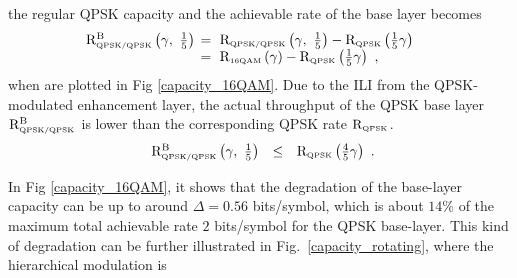 \documentclass[10pt,fleqn, twocolumn]{IEEEtran}
\begin{document}
the regular QPSK capacity and the achievable rate of the base
layer becomes
\begin{equation}\hspace{-0.2in}
\begin{array}{rl}
{\rm R}_{\mbox{\tiny QPSK/QPSK}}^{\rm B}\left(\gamma,\
\frac{1}{5}\right)&\hspace{-0.08in}=\ {\rm R}_{\mbox{\tiny
QPSK/QPSK}}\left(\gamma,\
\frac{1}{5}\right)-{\rm R}_{\mbox{\tiny QPSK}} \left(\frac{1}{5}\gamma\right)\\
&\hspace{-0.08in}=\ {\rm R}_{\mbox{\tiny
16QAM}}\left(\gamma\right)-{\rm R}_{\mbox{\tiny
QPSK}}\left(\frac{1}{5}\gamma\right)\ ,
\end{array}\label{R_16QAM_B1}
\end{equation}
\noindent when are plotted in Fig \ref{capacity_16QAM}. Due to the
ILI from the QPSK-modulated enhancement layer, the actual
throughput of the QPSK base layer ${\rm R}_{\mbox{\tiny
QPSK/QPSK}}^{\rm B}$ is lower than the corresponding QPSK rate
${\rm R}_{\mbox{\tiny QPSK}}$.
\begin{equation}
\begin{array}{rcl}
{\rm R}_{\mbox{\tiny QPSK/QPSK}}^{\rm B}\left(\gamma,\ \frac{1}{5}
\right)&\leq&{\rm R}_{\mbox{\tiny QPSK}}
\left(\frac{4}{5}\gamma\right)
\end{array}.\label{R_16QAM_B2}
\end{equation}
\begin{figure}
\end{figure}
\noindent In Fig \ref{capacity_16QAM}, it shows that the
degradation of the base-layer capacity can be up to around
$\Delta=0.56$ bits/symbol, which is about $14\%$ of the maximum
total achievable rate $2$ bits/symbol for the QPSK base-layer.
This kind of degradation can be further illustrated in
Fig.~\ref{capacity_rotating}, where the hierarchical modulation is
\end{document}
